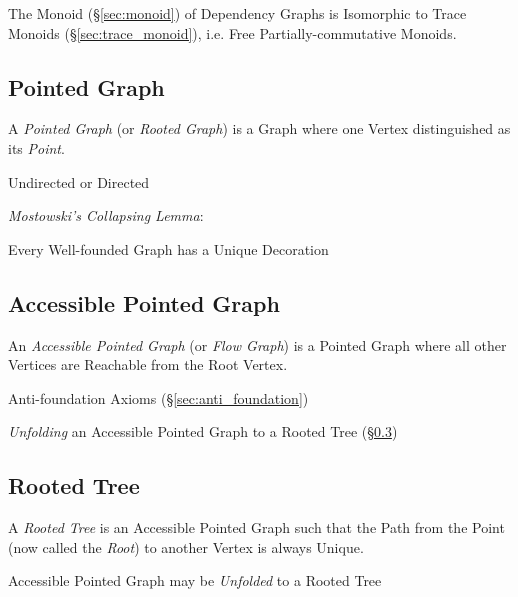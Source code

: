 The Monoid (\S\ref{sec:monoid}) of Dependency Graphs is Isomorphic to
Trace Monoids (\S\ref{sec:trace_monoid}), i.e. Free
Partially-commutative Monoids.



\subsection{Pointed Graph}\label{sec:pointed_graph}

A \emph{Pointed Graph} (or \emph{Rooted Graph}) is a Graph where one
Vertex distinguished as its \emph{Point}.

Undirected or Directed

\emph{Mostowski's Collapsing Lemma}: \cite{aczel88}

Every Well-founded Graph has a Unique Decoration %



\subsection{Accessible Pointed Graph}\label{sec:accessible_pointed}

An \emph{Accessible Pointed Graph} (or \emph{Flow Graph}) is a Pointed
Graph where all other Vertices are Reachable from the Root Vertex.

Anti-foundation Axioms (\S\ref{sec:anti_foundation})

\emph{Unfolding} an Accessible Pointed Graph to a Rooted Tree
(\S\ref{sec:rooted_tree})



\subsection{Rooted Tree}\label{sec:rooted_tree}

A \emph{Rooted Tree} is an Accessible Pointed Graph such that the Path
from the Point (now called the \emph{Root}) to another Vertex is
always Unique.

Accessible Pointed Graph may be \emph{Unfolded} to a Rooted Tree

